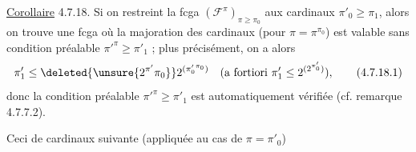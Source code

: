\uline{Corollaire} 4.7.18.  Si on restreint la fcga $(\mathcal F^\pi)_{\pi\geq\pi_0}$
aux cardinaux  $\pi'_0\geq\pi_1$,  alors on trouve
une fcga où la majoration des cardinaux
 (pour $\pi=\pi^{\pi_0}$) est valable  sans condition préalable
$\pi'^\pi\geq\pi'_1$ ; plus précisément, on a alors
\[
\pi'_1\leq\deleted{\unsure{2^{\pi'}\pi_0}}2^{(\pi'_0{}^{\pi_0})}
\quad(\text{a fortiori }\pi'_1\leq2^{(2^{\pi'_0})}),
\tag*{(4.7.18.1)}
\]
donc la condition préalable $\pi'^\pi\geq\pi'_1$ est
automatiquement vérifiée 
(cf. remarque 4.7.7.2).

Ceci  
de cardinaux suivante (appliquée au cas de $\pi=\pi'_0$)

